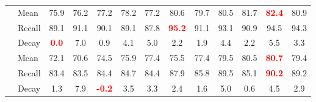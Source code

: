 \documentclass[runningheads]{llncs}
\newcommand{\textBC}[2]{\textbf{\textcolor{#1}{#2}}}
\begin{document}
\begin{table*}[ht]
{\begin{tabular}{ll|llllllllll|l}
				\multirow{3}{*}{}      
				&Mean& \multicolumn{1}{c}{\Large{75.9}} &  \multicolumn{1}{c}{\Large{76.2}}    & \multicolumn{1}{c}{\Large{77.2}}   &  \multicolumn{1}{c}{\Large{78.2}}   &   \multicolumn{1}{c}{\Large{77.2}}    & \multicolumn{1}{c}{\Large{80.6}}  &\multicolumn{1}{c}{\Large{79.7}}  &  \multicolumn{1}{c}{\Large{80.5}}      &  \multicolumn{1}{c}{\Large{81.7}}     &    \multicolumn{1}{c|}{\textBC{red}{\Large{82.4}}}     &   \multicolumn{1}{c}{\Large{80.9}}     \\
				&Recall & \multicolumn{1}{c}{\Large{89.1}} &  \multicolumn{1}{c}{\Large{91.1}}    & \multicolumn{1}{c}{\Large{90.1}}   &  \multicolumn{1}{c}{\Large{89.1}}   &   \multicolumn{1}{c}{\Large{87.8}}    & \multicolumn{1}{c}{\textBC{red}{\Large{95.2}}}  &\multicolumn{1}{c}{\Large{91.1}}  &  \multicolumn{1}{c}{\Large{93.1}}      &  \multicolumn{1}{c}{\Large{90.9}}     &     \multicolumn{1}{c|}{\Large{94.5}}     &   \multicolumn{1}{c}{\Large{94.3}}    \\
				&Decay & \multicolumn{1}{c}{\textBC{red}{\Large{0.0}}} &  \multicolumn{1}{c}{\Large{7.0}}    & \multicolumn{1}{c}{\Large{0.9}}   &  \multicolumn{1}{c}{\Large{4.1}}   &   \multicolumn{1}{c}{\Large{5.0}}    & \multicolumn{1}{c}{\Large{2.2}}  &\multicolumn{1}{c}{\Large{1.9}}  &  \multicolumn{1}{c}{\Large{4.4}}      &  \multicolumn{1}{c}{\Large{2.2}}     &     \multicolumn{1}{c|}{\Large{5.5}}     &   \multicolumn{1}{c}{\Large{3.3}}   \\
				
				\hline
				\multirow{3}{*}{}      
				&Mean& \multicolumn{1}{c}{\Large{72.1}} &  \multicolumn{1}{c}{\Large{70.6}}    & \multicolumn{1}{c}{\Large{74.5}}   &  \multicolumn{1}{c}{\Large{75.9}}   &   \multicolumn{1}{c}{\Large{77.4}}    & \multicolumn{1}{c}{\Large{75.5}}  &\multicolumn{1}{c}{\Large{77.4}}  &  \multicolumn{1}{c}{\Large{79.5}}      &  \multicolumn{1}{c}{\Large{80.5}}     &    \multicolumn{1}{c|}{\textBC{red}{\Large{80.7}}}     &   \multicolumn{1}{c}{\Large{79.4}}     \\
				&Recall & \multicolumn{1}{c}{\Large{83.4}} &  \multicolumn{1}{c}{\Large{83.5}}    & \multicolumn{1}{c}{\Large{84.4}}   &  \multicolumn{1}{c}{\Large{84.7}}   &   \multicolumn{1}{c}{\Large{84.4}}    & \multicolumn{1}{c}{\Large{87.9}}  &\multicolumn{1}{c}{\Large{85.8}}  &  \multicolumn{1}{c}{\Large{89.5}}      &  \multicolumn{1}{c}{\Large{85.1}}     &     \multicolumn{1}{c|}{\textBC{red}{\Large{90.2}}}     &   \multicolumn{1}{c}{\Large{89.2}}    \\
				&Decay & \multicolumn{1}{c}{\Large{1.3}} &  \multicolumn{1}{c}{\Large{7.9}}    & \multicolumn{1}{c}{\textBC{red}{\Large{-0.2}}}   &  \multicolumn{1}{c}{\Large{3.5}}   &   \multicolumn{1}{c}{\Large{3.3}}    & \multicolumn{1}{c}{\Large{2.4}}  &\multicolumn{1}{c}{\Large{1.6}}  &  \multicolumn{1}{c}{\Large{5.0}}      &  \multicolumn{1}{c}{\Large{0.6}}     &     \multicolumn{1}{c|}{\Large{4.5}}     &   \multicolumn{1}{c}{\Large{2.9}}  \\
				\bottomrule[2pt]
			\end{tabular}
		}
\end{table*}  


	
	\clearpage

	
\end{document}
